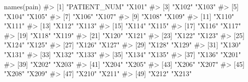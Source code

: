 \documentclass[
  letterpaper,
]{krantz}
\makeatletter
\newenvironment{Shaded}{\begin{snugshade}}{\end{snugshade}}
\newcommand{\CommentTok}[1]{\textcolor[rgb]{0.37,0.37,0.37}{#1}}
\newcommand{\FunctionTok}[1]{\textcolor[rgb]{0.28,0.35,0.67}{#1}}
\newcommand{\NormalTok}[1]{\textcolor[rgb]{0.00,0.23,0.31}{#1}}
\newenvironment{kframe}{%
\medskip{}
\setlength{\fboxsep}{.8em}
 \def\at@end@of@kframe{}%
 \ifinner\ifhmode%
  \def\at@end@of@kframe{\end{minipage}}%
  \begin{minipage}{\columnwidth}%
 \fi\fi%
 \def\FrameCommand##1{\hskip\@totalleftmargin \hskip-\fboxsep
 \colorbox{shadecolor}{##1}\hskip-\fboxsep
     \hskip-\linewidth \hskip-\@totalleftmargin \hskip\columnwidth}%
 \MakeFramed {\advance\hsize-\width
   \@totalleftmargin\z@ \linewidth\hsize
   \@setminipage}}%
 {\par\unskip\endMakeFramed%
 \at@end@of@kframe}
\renewenvironment{Shaded}{\begin{kframe}}{\end{kframe}}
\makeatother
\begin{document}
\begin{Shaded}
\begin{Highlighting}[]
\FunctionTok{names}\NormalTok{(pain)}
\CommentTok{\#\textgreater{}  [1] "PATIENT\_NUM"                      "X101"                            }
\CommentTok{\#\textgreater{}  [3] "X102"                             "X103"                            }
\CommentTok{\#\textgreater{}  [5] "X104"                             "X105"                            }
\CommentTok{\#\textgreater{}  [7] "X106"                             "X107"                            }
\CommentTok{\#\textgreater{}  [9] "X108"                             "X109"                            }
\CommentTok{\#\textgreater{} [11] "X110"                             "X111"                            }
\CommentTok{\#\textgreater{} [13] "X112"                             "X113"                            }
\CommentTok{\#\textgreater{} [15] "X114"                             "X115"                            }
\CommentTok{\#\textgreater{} [17] "X116"                             "X117"                            }
\CommentTok{\#\textgreater{} [19] "X118"                             "X119"                            }
\CommentTok{\#\textgreater{} [21] "X120"                             "X121"                            }
\CommentTok{\#\textgreater{} [23] "X122"                             "X123"                            }
\CommentTok{\#\textgreater{} [25] "X124"                             "X125"                            }
\CommentTok{\#\textgreater{} [27] "X126"                             "X127"                            }
\CommentTok{\#\textgreater{} [29] "X128"                             "X129"                            }
\CommentTok{\#\textgreater{} [31] "X130"                             "X131"                            }
\CommentTok{\#\textgreater{} [33] "X132"                             "X133"                            }
\CommentTok{\#\textgreater{} [35] "X134"                             "X135"                            }
\CommentTok{\#\textgreater{} [37] "X136"                             "X201"                            }
\CommentTok{\#\textgreater{} [39] "X202"                             "X203"                            }
\CommentTok{\#\textgreater{} [41] "X204"                             "X205"                            }
\CommentTok{\#\textgreater{} [43] "X206"                             "X207"                            }
\CommentTok{\#\textgreater{} [45] "X208"                             "X209"                            }
\CommentTok{\#\textgreater{} [47] "X210"                             "X211"                            }
\CommentTok{\#\textgreater{} [49] "X212"                             "X213"                            }

\end{Highlighting}
\end{Shaded}
\end{document}
